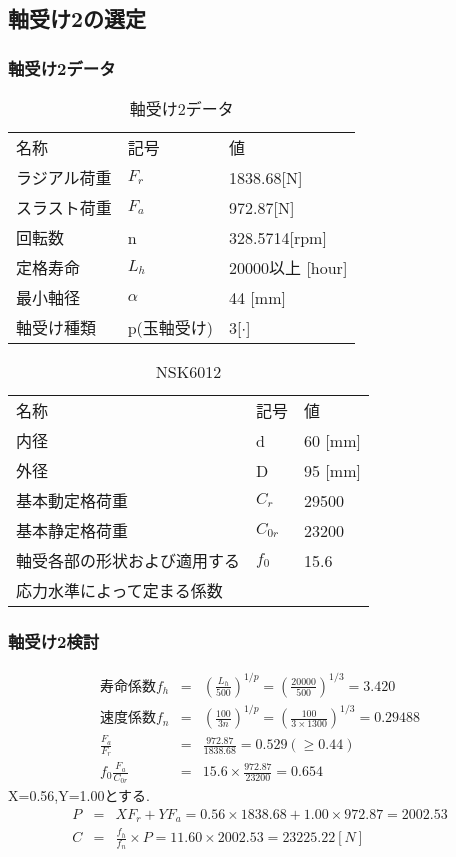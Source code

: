 \newpage
\subsection{軸受け2の選定}
\subsubsection{軸受け2データ}
\begin{table}[htb]
\begin{center}
  \caption{軸受け2データ}
  \begin{tabular}{lll} \hline
名称&記号&値\\
ラジアル荷重&$F_r$&1838.68[N]\\
スラスト荷重&$F_a$&972.87[N]\\
回転数&n&328.5714[rpm]\\
定格寿命&$L_h$&20000以上 [hour]\\
最小軸径&$\alpha$&44 [mm]\\
軸受け種類&p(玉軸受け)&3[$\cdot$]\\
\hline
  \end{tabular}
\end{center}
\end{table}

\begin{table}[htb]
\begin{center}
  \caption{NSK6012}
  \begin{tabular}{lll} \hline
名称&記号&値\\
内径& d &60 [mm]\\
外径& D &95 [mm]\\
基本動定格荷重&$C_{r}$&29500\\
基本静定格荷重&$C_{0r}$&23200\\
軸受各部の形状および適用する&$f_0$&15.6\\
応力水準によって定まる係数&&\\
\hline
  \end{tabular}
\end{center}
\end{table}

\subsubsection{軸受け2検討}
\begin{eqnarray}
寿命係数f_h &=& \left( \frac{L_h}{500} \right)^{1/p} = \left( \frac{20000}{500} \right)^{1/3} = 3.420\\
速度係数f_n &=& \left( \frac{100}{3n} \right)^{1/p} = \left( \frac{100}{3 \times 1300} \right)^{1/3} = 0.29488\\
\frac{F_a}{F_r} &=& \frac{972.87}{1838.68} = 0.529 (\geq 0.44)\\
f_0\frac{F_a}{C_{0r}}&=& 15.6 \times \frac{972.87}{23200} = 0.654
\end{eqnarray}
X=0.56,Y=1.00とする.
\begin{eqnarray}
P &=& XF_r+YF_a = 0.56 \times 1838.68 + 1.00 \times 972.87 = 2002.53\\
C &=& \frac{f_h}{f_n} \times P = 11.60 \times 2002.53 = 23225.22[N]
\end{eqnarray}

